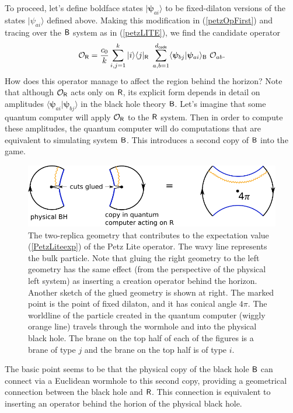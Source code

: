\documentclass[12pt]{article}
\newcommand{\be}{\begin{equation}}
\newcommand{\ee}{\end{equation}}
\numberwithin{equation}{section}
\begin{document}
To proceed, let's define boldface states $|\bm{\psi}_{ai}\rangle$ to be fixed-dilaton versions of the states $|\psi_{ai}\rangle$ defined above. Making this modification in (\ref{petzOpFirst}) and tracing over the $\sf{B}$ system as in (\ref{petzLITE}), we find the candidate operator
\be
\mathcal{O}_{\sf{R}} = \frac{c_0}{k}\sum_{i,j = 1}^k|i\rangle\langle j|_{\sf{R}} \ \sum_{a,b = 1}^{d_{\sf{code}}}\langle\bm{\psi}_{bj}|\bm{\psi}_{ai}\rangle_{\sf{B}} \ \mathcal{O}_{ab}.
\ee
How does this operator manage to affect the region behind the horizon? Note that although $\mathcal{O}_{\sf{R}}$ acts only on $\sf{R}$, its explicit form depends in detail on amplitudes $\langle \bm{\psi}_{ai}|\bm{\psi}_{bj}\rangle$ in the black hole theory $\sf{B}$. Let's imagine that some quantum computer will apply $\mathcal{O}_{\sf{R}}$ to the $\sf{R}$ system. Then in order to compute these amplitudes, the quantum computer will do computations that are equivalent to simulating system $\sf{B}$. This introduces a second copy of $\sf{B}$ into the game.
\begin{figure}[t]
\begin{center}
\includegraphics[width = .7\textwidth]{images/petzLite.pdf}
\caption{{\small The two-replica geometry that contributes to the expectation value (\ref{PetzLiteexp}) of the Petz Lite operator. The wavy line represents the bulk particle. Note that gluing the right geometry to the left geometry has the same effect (from the perspective of the physical left system) as inserting a creation operator behind the horizon. Another sketch of the glued geometry is shown at right. The marked point is the point of fixed dilaton, and it has conical angle $4\pi$. The worldline of the particle created in the quantum computer (wiggly orange line) travels through the wormhole and into the physical black hole. The brane on the top half of each of the figures is a brane of type $j$ and the brane on the top half is of type $i$.}}\label{fig:petzLite}
\end{center}
\end{figure}

The basic point seems to be that the physical copy of the black hole $\sf{B}$ can connect via a Euclidean wormhole to this second copy, providing a geometrical connection between the black hole and $\sf{R}$. This connection is equivalent to inserting an operator behind the horion of the physical black hole.
\end{document}
